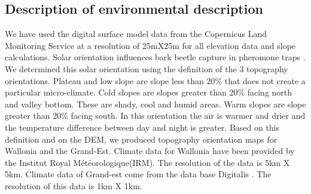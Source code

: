 \documentclass[3p,procedia]{elsarticle}
\begin{document}

	



\subsection{Description of environmental description}


We have used the digital surface model data from the Copernicus Land Monitoring Service \citep{DEM_copernicus}  at a resolution of 25mX25m for all elevation data and slope calculations.
Solar orientation influences bark beetle capture in pheromone traps \citep{AFR64}.
We determined this solar orientation using the \cite{Delvaux_galoux} definition of the 3 topography orientations.
Plateau and low slope are slope less than  20\% that does not create a particular micro-climate. 
Cold slopes are slopes greater than  20\% facing north and valley bottom. 
These are shady, cool and humid areas. 
Warm slopes are slope greater than  20\% facing south. 
In this orientation the air is warmer and drier and the temperature difference between day and night is greater.
Based on this definition and on the DEM, we produced topography orientation  maps for Wallonia and the Grand-Est.
Climate data for Wallonia have been provided by the Institut Royal Météorologique(IRM). The resolution of the data is 5km X 5km. Climate data of  Grand-est come from the data base Digitalis \citep{piedallu_presentation_2014}. The resolution of this data is 1km X 1km.
\end{document}
